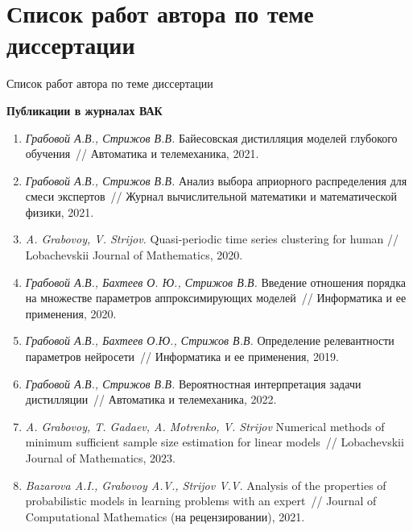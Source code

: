\documentclass[10pt,pdf,hyperref={unicode}]{beamer}
\begin{document}
\section{Список работ автора по теме диссертации}
\begin{frame}{Список работ автора по теме диссертации}
\justifying
{
\scriptsize
\textbf{Публикации в журналах ВАК}

\begin{enumerate}
    \item \textit{Грабовой А.В., Стрижов В.В.} Байесовская дистилляция моделей глубокого обучения~// Автоматика и телемеханика, 2021.
    \item \textit{Грабовой А.В., Стрижов В.В.} Анализ выбора априорного распределения для смеси экспертов~// Журнал вычислительной математики и математической физики, 2021.
    \item \textit{A. Grabovoy, V. Strijov.} Quasi-periodic time series clustering for human // Lobachevskii Journal of Mathematics, 2020.
    \item \textit{Грабовой А.В., Бахтеев О. Ю., Стрижов В.В.} Введение отношения порядка на множестве параметров аппроксимирующих моделей~// Информатика и ее применения, 2020.
    \item \textit{Грабовой А.В., Бахтеев О.Ю., Стрижов В.В.} Определение релевантности параметров нейросети~// Информатика и ее применения, 2019.
    \item \textit{Грабовой А.В., Стрижов В.В.} Вероятностная интерпретация задачи дистилляции~// Автоматика и телемеханика, 2022.
    \item \textit{A. Grabovoy, T. Gadaev, A. Motrenko, V. Strijov} Numerical methods of minimum sufficient sample size estimation for linear models~// Lobachevskii Journal of Mathematics, 2023.
    \item \textit{Bazarova A.I., Grabovoy A.V., Strijov V.V.} Analysis of the properties of probabilistic models in learning problems with an expert~// Journal of Computational Mathematics (на рецензировании), 2021.
\end{enumerate}

}
\end{frame}
\end{document}
